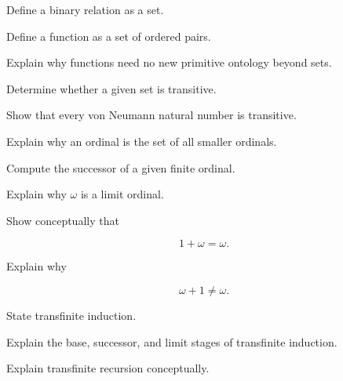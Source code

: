 \begin{exercise}[2]
Define a binary relation as a set.
\end{exercise}

\begin{exercise}[2]
Define a function as a set of ordered pairs.
\end{exercise}

\begin{exercise}[3]
Explain why functions need no new primitive ontology beyond sets.
\end{exercise}

\begin{exercise}[2]
Determine whether a given set is transitive.
\end{exercise}

\begin{exercise}[3]
Show that every von Neumann natural number is transitive.
\end{exercise}

\begin{exercise}[3]
Explain why an ordinal is the set of all smaller ordinals.
\end{exercise}

\begin{exercise}[2]
Compute the successor of a given finite ordinal.
\end{exercise}

\begin{exercise}[3]
Explain why \(\omega\) is a limit ordinal.
\end{exercise}

\begin{exercise}[3]
Show conceptually that

\[
1+\omega=\omega.
\]
\end{exercise}

\begin{exercise}[3]
Explain why

\[
\omega+1\neq\omega.
\]
\end{exercise}

\begin{exercise}[3]
State transfinite induction.
\end{exercise}

\begin{exercise}[3]
Explain the base, successor, and limit stages of transfinite induction.
\end{exercise}

\begin{exercise}[3]
Explain transfinite recursion conceptually.
\end{exercise}

